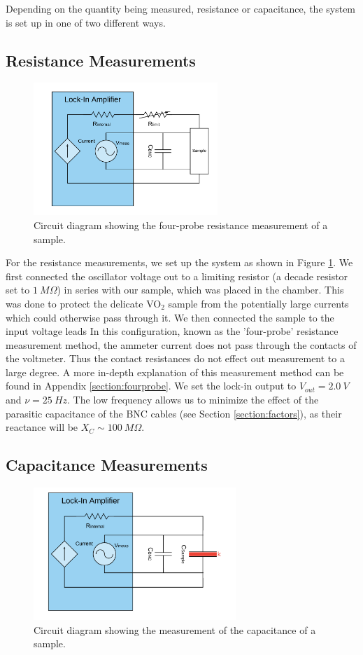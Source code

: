 \documentclass[%
 reprint,
 amsmath,amssymb,
 aps,
 pra,
]{revtex4-1}
\begin{document}
Depending on the quantity being measured, resistance or capacitance, the system is set up in one of two different ways.

\subsection{Resistance Measurements}

\begin{figure}[H]
	\centering
	\includegraphics[height=5cm]{diagram_res.png}
	\caption{Circuit diagram showing the four-probe resistance measurement of a sample.}
	\label{fig:ResistanceMeasurements}
\end{figure}

For the resistance measurements, we set up the system as shown in Figure \ref{fig:ResistanceMeasurements}. We first connected the oscillator voltage out to a limiting resistor (a decade resistor set to $1~M\Omega$) in series with our sample, which was placed in the chamber. This was done to protect the delicate VO$_2$ sample from the potentially large currents which could otherwise pass through it. We then connected the sample to the input voltage leads In this configuration, known as the 'four-probe' resistance measurement method, the ammeter current does not pass through the contacts of the voltmeter. Thus the contact resistances do not effect out measurement to a large degree. A more in-depth explanation of this measurement method can be found in Appendix \ref{section:fourprobe}. We set the lock-in output to $V_{out} = 2.0~V$ and $\nu = 25~Hz$. The low frequency allows us to minimize the effect of the parasitic capacitance of the BNC cables (see Section \ref{section:factors}), as their reactance will be $X_C \sim 100~M\Omega$.

\subsection{Capacitance Measurements}

\begin{figure}[H]
	\centering
	\includegraphics[height=5cm]{diagram_cap.png}
	\caption{Circuit diagram showing the measurement of the capacitance of a sample.}
	\label{fig:CapMeasurements}
\end{figure}
\end{document}
